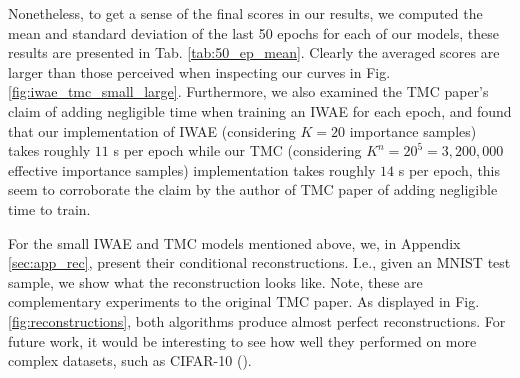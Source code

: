 \documentclass{article}
\begin{document}
Nonetheless, to get a sense of the final scores in our results, we computed the mean and standard deviation of the last 50 epochs for each of our models, these results are presented in Tab. \ref{tab:50_ep_mean}. Clearly the averaged scores are larger than those perceived when inspecting our curves in Fig. \ref{fig:iwae_tmc_small_large}. Furthermore, we also examined the TMC paper's claim of adding negligible time when training an IWAE for each epoch, and found that our implementation of IWAE (considering $K=20$ importance samples) takes roughly $11$ s per epoch while our TMC (considering $K^n=20^5=3,200,000$ effective importance samples) implementation takes roughly $14$ s per epoch, this seem to corroborate the claim by the author of TMC paper of adding negligible time to train. 

For the small IWAE and TMC models mentioned above, we, in Appendix \ref{sec:app_rec}, present their conditional reconstructions. I.e., given an MNIST test sample, we show what the reconstruction looks like. Note, these are complementary experiments to the original TMC paper. As displayed in Fig. \ref{fig:reconstructions}, both algorithms produce almost perfect reconstructions. For future work, it would be interesting to see how well they performed on more complex datasets, such as CIFAR-10 (\cite{cifar10}).
\end{document}

